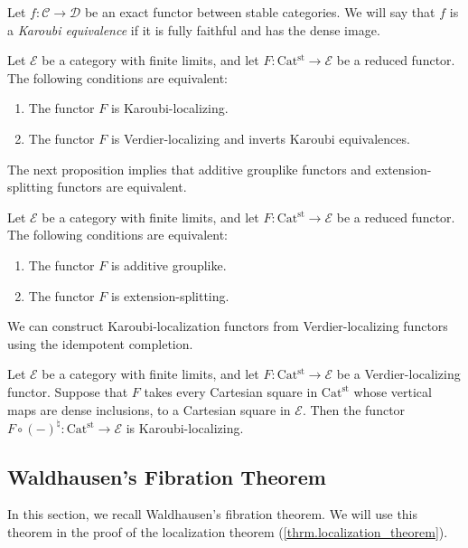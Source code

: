 \documentclass[a4paper,dvipdfmx,11pt,reqno]{amsart}
\newcommand{\C}{\mathcal{C}}
\newcommand{\D}{\mathcal{D}}
\newcommand{\E}{\mathcal{E}}
\newcommand{\Catst}{\mathrm{Cat^{st}}}
\begin{document}
\begin{definition}
  Let $f : \C \to \D$ be an exact functor between stable categories.
  We will say that $f$ is a \textit{Karoubi equivalence} if it is fully faithful and has the dense image.
\end{definition}

\begin{proposition} %
  Let $\E$ be a category with finite limits, and let $F : \Catst \to \E$ be a reduced functor.
  The following conditions are equivalent:
  \begin{enumerate}
    \item The functor $F$ is Karoubi-localizing.
    \item The functor $F$ is Verdier-localizing and inverts Karoubi equivalences.
  \end{enumerate}
\end{proposition}

The next proposition implies that additive grouplike functors and extension-splitting functors are equivalent. 

\begin{proposition} %
  Let $\E$ be a category with finite limits, and let $F : \Catst \to \E$ be a reduced functor.
  The following conditions are equivalent:
  \begin{enumerate}
    \item The functor $F$ is additive grouplike.
    \item The functor $F$ is extension-splitting.
  \end{enumerate}
\end{proposition}

We can construct Karoubi-localization functors from Verdier-localizing functors using the idempotent completion.

\begin{proposition}
  Let $\E$ be a category with finite limits, and let $F : \Catst \to \E$ be a Verdier-localizing functor.
  Suppose that $F$ takes every Cartesian square in $\Catst$ whose vertical maps are dense inclusions, to a Cartesian square in $\E$. 
  Then the functor $F \circ (-)^{\natural} : \Catst \to \E$ is Karoubi-localizing.
\end{proposition}

\subsection{Waldhausen's Fibration Theorem}

In this section, we recall Waldhausen's fibration theorem.
We will use this theorem in the proof of the localization theorem (\cref{thrm.localization_theorem}).
\end{document}

